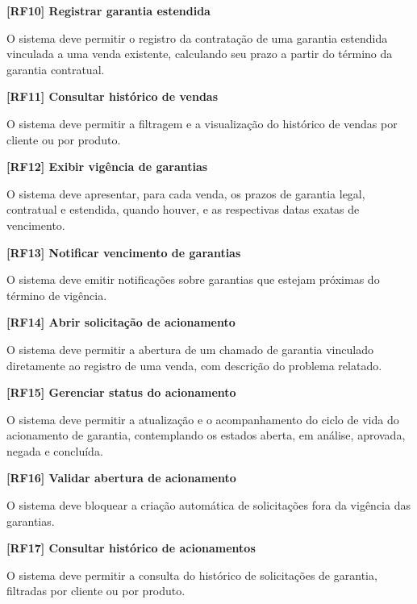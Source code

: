 \vspace{\baselineskip}
\noindent\textbf{[RF10] Registrar garantia estendida}

O sistema deve permitir o registro da contratação de uma garantia estendida vinculada a uma venda existente, calculando seu prazo a partir do término da garantia contratual.

\vspace{\baselineskip}
\noindent\textbf{[RF11] Consultar histórico de vendas}

O sistema deve permitir a filtragem e a visualização do histórico de vendas por cliente ou por produto.

\vspace{\baselineskip}
\noindent\textbf{[RF12] Exibir vigência de garantias}

O sistema deve apresentar, para cada venda, os prazos de garantia legal, contratual e estendida, quando houver, e as respectivas datas exatas de vencimento.

\vspace{\baselineskip}
\noindent\textbf{[RF13] Notificar vencimento de garantias}

O sistema deve emitir notificações sobre garantias que estejam próximas do término de vigência.

\vspace{\baselineskip}
\noindent\textbf{[RF14] Abrir solicitação de acionamento}

O sistema deve permitir a abertura de um chamado de garantia vinculado diretamente ao registro de uma venda, com descrição do problema relatado.

\vspace{\baselineskip}
\noindent\textbf{[RF15] Gerenciar status do acionamento}

O sistema deve permitir a atualização e o acompanhamento do ciclo de vida do acionamento de garantia, contemplando os estados aberta, em análise, aprovada, negada e concluída.

\vspace{\baselineskip}
\noindent\textbf{[RF16] Validar abertura de acionamento}

O sistema deve bloquear a criação automática de solicitações fora da vigência das garantias.

\vspace{\baselineskip}
\noindent\textbf{[RF17] Consultar histórico de acionamentos}

O sistema deve permitir a consulta do histórico de solicitações de garantia, filtradas por cliente ou por produto.

